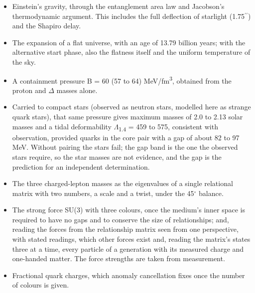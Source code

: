 \documentclass[
  11pt,
]{article}
\providecommand{\tightlist}{%
  \setlength{\itemsep}{0pt}\setlength{\parskip}{0pt}}
\begin{document}
\begin{itemize}
\tightlist
\item
  Einstein's gravity, through the entanglement area law and Jacobson's thermodynamic argument. This includes the full deflection of starlight (1.75\ensuremath{^{\prime\prime}}) and the Shapiro delay.
\item
  The expansion of a flat universe, with an age of 13.79 billion years; with the alternative start phase, also the flatness itself and the uniform temperature of the sky.
\item
  A containment pressure B = 60 (57 to 64) MeV/fm\textsuperscript{3}, obtained from the proton and \ensuremath{\Delta} masses alone.
\item
  Carried to compact stars (observed as neutron stars, modelled here as strange quark stars), that same pressure gives maximum masses of 2.0 to 2.13 solar masses and a tidal deformability \ensuremath{\Lambda}\textsubscript{1.4} = 459 to 575, consistent with observation, provided quarks in the core pair with a gap of about 82 to 97 MeV. Without pairing the stars fail; the gap band is the one the observed stars require, so the star masses are not evidence, and the gap is the prediction for an independent determination.
\item
  The three charged-lepton masses as the eigenvalues of a single relational matrix with two numbers, a scale and a twist, under the 45\ensuremath{^\circ} balance.
\item
  The strong force SU(3) with three colours, once the medium's inner space is required to have no gaps and to conserve the size of relationships; and, reading the forces from the relationship matrix seen from one perspective, with stated readings, which other forces exist and, reading the matrix's states three at a time, every particle of a generation with its measured charge and one-handed matter. The force strengths are taken from measurement.
\item
  Fractional quark charges, which anomaly cancellation fixes once the number of colours is given.
\end{itemize}
\end{document}

